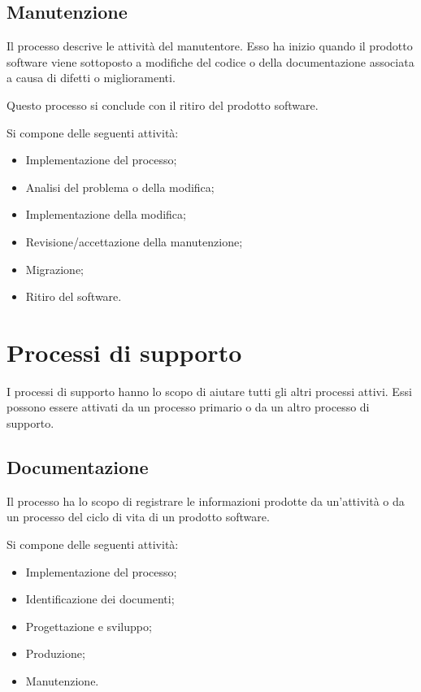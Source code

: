 \subsection{Manutenzione}

Il processo descrive le attività del manutentore. Esso ha inizio quando il prodotto software viene sottoposto a modifiche del codice o della documentazione associata a causa di difetti o miglioramenti.

Questo processo si conclude con il ritiro del prodotto software.

Si compone delle seguenti attività:
\begin{itemize}
    \item Implementazione del processo;
    \item Analisi del problema o della modifica;
    \item Implementazione della modifica;
    \item Revisione/accettazione della manutenzione;
    \item Migrazione;
    \item Ritiro del software.
\end{itemize}


\section{Processi di supporto}

I processi di supporto hanno lo scopo di aiutare tutti gli altri processi attivi. Essi possono essere attivati da un processo primario o da un altro processo di supporto.

\subsection{Documentazione}
Il processo ha lo scopo di registrare le informazioni prodotte da un'attività o da un processo del ciclo di vita di un prodotto software.

Si compone delle seguenti attività:

\begin{itemize}
    \item Implementazione del processo;
    \item Identificazione dei documenti;
    \item Progettazione e sviluppo;
    \item Produzione;
    \item Manutenzione.
\end{itemize}

